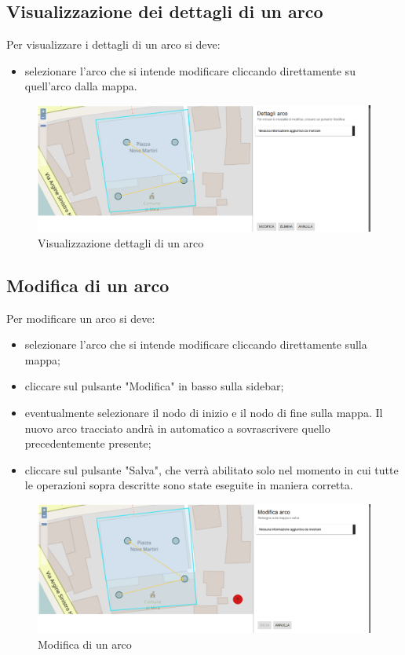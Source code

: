 \subsection{Visualizzazione dei dettagli di un arco}
Per visualizzare i dettagli di un arco si deve:
\begin{itemize}
	\item selezionare l'arco che si intende modificare cliccando direttamente su quell'arco dalla mappa.
\end{itemize}

\begin{figure}[H]
\centering
\includegraphics[width=\textwidth]{img/visualizzazione_arco.png}
\caption{Visualizzazione dettagli di un arco}
\end{figure}

\subsection{Modifica di un arco}
Per modificare un arco si deve:
\begin{itemize}
	\item selezionare l'arco che si intende modificare cliccando direttamente sulla mappa;
	\item cliccare sul pulsante "Modifica" in basso sulla sidebar;
	\item eventualmente selezionare il nodo di inizio e il nodo di fine sulla mappa. Il nuovo arco tracciato andrà in automatico a sovrascrivere quello precedentemente presente;
	\item cliccare sul pulsante "Salva", che verrà abilitato solo nel momento in cui tutte le operazioni sopra descritte sono state eseguite in maniera corretta.
\end{itemize}

\begin{figure}[H]
\centering
\includegraphics[width=\textwidth]{img/modifica_arco.png}
\caption{Modifica di un arco}
\end{figure}

